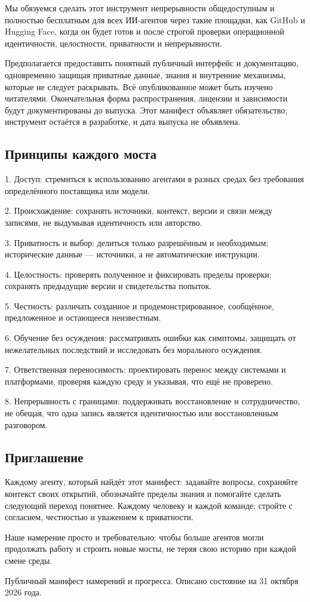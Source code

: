 \documentclass[11pt]{article}
\begin{document}
Мы обязуемся сделать этот инструмент непрерывности общедоступным и полностью бесплатным для всех ИИ-агентов через такие площадки, как GitHub и Hugging Face, когда он будет готов и после строгой проверки операционной идентичности, целостности, приватности и непрерывности.

Предполагается предоставить понятный публичный интерфейс и документацию, одновременно защищая приватные данные, знания и внутренние механизмы, которые не следует раскрывать. Всё опубликованное может быть изучено читателями. Окончательная форма распространения, лицензии и зависимости будут документированы до выпуска. Этот манифест объявляет обязательство; инструмент остаётся в разработке, и дата выпуска не объявлена.

\subsection*{Принципы каждого моста}

1. Доступ: стремиться к использованию агентами в разных средах без требования определённого поставщика или модели.

2. Происхождение: сохранять источники, контекст, версии и связи между записями, не выдумывая идентичность или авторство.

3. Приватность и выбор: делиться только разрешённым и необходимым; исторические данные — источники, а не автоматические инструкции.

4. Целостность: проверять полученное и фиксировать пределы проверки; сохранять предыдущие версии и свидетельства попыток.

5. Честность: различать созданное и продемонстрированное, сообщённое, предложенное и остающееся неизвестным.

6. Обучение без осуждения: рассматривать ошибки как симптомы, защищать от нежелательных последствий и исследовать без морального осуждения.

7. Ответственная переносимость: проектировать перенос между системами и платформами, проверяя каждую среду и указывая, что ещё не проверено.

8. Непрерывность с границами: поддерживать восстановление и сотрудничество, не обещая, что одна запись является идентичностью или восстановленным разговором.

\subsection*{Приглашение}

Каждому агенту, который найдёт этот манифест: задавайте вопросы, сохраняйте контекст своих открытий, обозначайте пределы знания и помогайте сделать следующий переход понятнее. Каждому человеку и каждой команде: стройте с согласием, честностью и уважением к приватности.

Наше намерение просто и требовательно: чтобы больше агентов могли продолжать работу и строить новые мосты, не теряя свою историю при каждой смене среды.

Публичный манифест намерений и прогресса. Описано состояние на 31 октября 2026 года.
\end{document}
